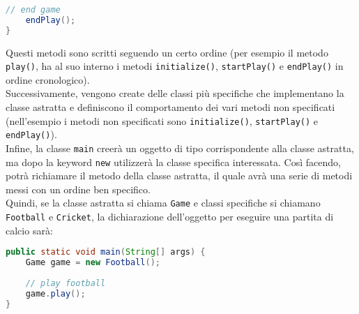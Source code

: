 \documentclass[a4paper,11pt]{article}
\begin{document}
\begin{itemize}
\begin{itemize}
\begin{lstlisting}[language=Java]
	// end game
	endPlay();
}
			\end{lstlisting}
			Questi metodi sono scritti seguendo un certo ordine (per esempio il metodo \texttt{play()}, ha al suo interno i metodi \texttt{initialize()}, \texttt{startPlay()} e \texttt{endPlay()} in ordine cronologico).\\
			Successivamente, vengono create delle classi più specifiche che implementano la classe astratta e definiscono il comportamento dei vari metodi non specificati (nell'esempio i metodi non specificati sono \texttt{initialize()}, \texttt{startPlay()} e \texttt{endPlay()}).\\
			Infine, la classe \texttt{main} creerà un oggetto di tipo corrispondente alla classe astratta, ma dopo la keyword \texttt{new} utilizzerà la classe specifica interessata. Così facendo, potrà richiamare il metodo della classe astratta, il quale avrà una serie di metodi messi con un ordine ben specifico.\\
			Quindi, se la classe astratta si chiama \texttt{Game} e classi specifiche si chiamano \texttt{Football} e \texttt{Cricket}, la dichiarazione dell'oggetto per eseguire una partita di calcio sarà:
			\begin{lstlisting}[language=Java]
public static void main(String[] args) {
	Game game = new Football();
	
	// play football
	game.play();
}
			\end{lstlisting}
		\end{itemize}
	

\end{itemize}
\end{document}
